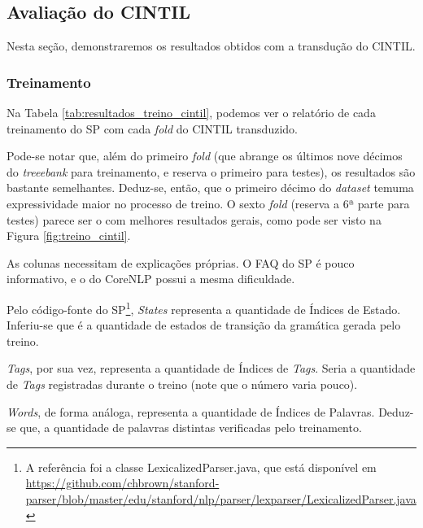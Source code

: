\subsection{Avaliação do CINTIL}
\label{subsec:resultados_cintil}
Nesta seção, demonstraremos os resultados obtidos com a transdução do CINTIL.

\subsubsection{Treinamento} 
\label{subsubsec:result_treino_cintil}

Na Tabela \ref{tab:resultados_treino_cintil}, podemos ver o relatório de cada treinamento do SP com cada \textit{fold} do CINTIL transduzido.
\begin{center}
    
\end{center}

Pode-se notar que, além do primeiro \textit{fold} (que abrange os últimos nove décimos do \textit{treeebank} para treinamento, e reserva o primeiro para testes), os resultados são bastante semelhantes. Deduz-se, então, que o primeiro décimo do \textit{dataset} temuma expressividade maior no processo de treino. O sexto \textit{fold} (reserva a 6ª parte para testes) parece ser o com melhores resultados gerais, como pode ser visto na Figura \ref{fig:treino_cintil}.
\begin{center}
    
\end{center}

As colunas necessitam de explicações próprias. O FAQ do SP é pouco informativo, e o do CoreNLP possui a mesma dificuldade.

Pelo código-fonte do SP\footnote{A referência foi a classe LexicalizedParser.java, que está disponível em \url{https://github.com/chbrown/stanford-parser/blob/master/edu/stanford/nlp/parser/lexparser/LexicalizedParser.java}}, \textit{States} representa a quantidade de Índices de Estado. Inferiu-se que é a quantidade de estados de transição da gramática gerada pelo treino. 

\textit{Tags}, por sua vez, representa a quantidade de Índices de \textit{Tags}. Seria a quantidade de \textit{Tags} registradas durante o treino (note que o número varia pouco).

\textit{Words}, de forma análoga, representa a quantidade de Índices de Palavras. Deduz-se que, a quantidade de palavras distintas verificadas pelo treinamento.

